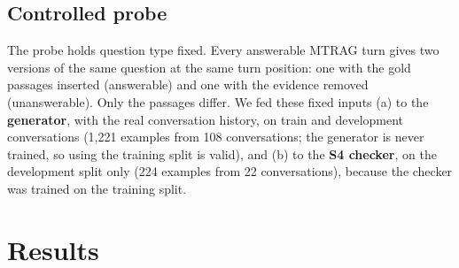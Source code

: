 \documentclass[11pt,a4paper]{report}
\newcommand{\sys}[1]{\textsf{#1}}
\begin{document}
\section{Controlled probe}\label{sec:probe}
The probe holds question type fixed. Every answerable MTRAG turn gives two versions of the same question at the same turn position: one with the gold passages inserted (answerable) and one with the evidence removed (unanswerable). Only the passages differ. We fed these fixed inputs (a) to the \textbf{generator}, with the real conversation history, on train and development conversations (1{,}221 examples from 108 conversations; the generator is never trained, so using the training split is valid), and (b) to the \textbf{\sys{S4} checker}, on the development split only (224 examples from 22 conversations), because the checker was trained on the training split.

\chapter{Results}\label{ch:results}
\end{document}
